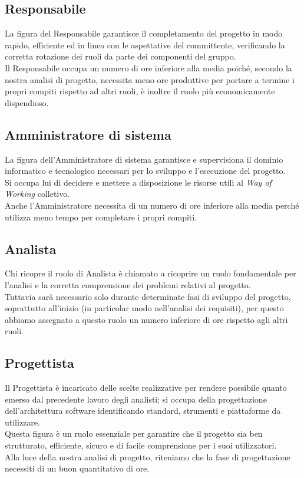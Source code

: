 \documentclass[a4paper, 11pt]{article}
\begin{document}
\subsection{Responsabile}
La figura del Responsabile garantisce il completamento del progetto in modo rapido, efficiente ed in linea con le aspettative del committente, verificando la corretta rotazione dei ruoli da parte dei componenti del gruppo. \\
Il Responsabile occupa un numero di ore inferiore alla media poiché, secondo la nostra analisi di progetto, necessita meno ore produttive per portare a termine i propri compiti rispetto ad altri ruoli, è inoltre il ruolo più economicamente dispendioso.

\subsection{Amministratore di sistema}

La figura dell'Amministratore di sistema garantisce e supervisiona il dominio informatico e tecnologico necessari per lo sviluppo e l'esecuzione del progetto. \\
Si occupa lui di decidere e mettere a disposizione le risorse utili al \textit{Way of Working} colletivo. \\
Anche l'Amministratore necessita di un numero di ore inferiore alla media perché utilizza meno tempo per completare i propri compiti.

\subsection{Analista}
Chi ricopre il ruolo di Analista è chiamato a ricoprire un ruolo fondamentale per l'analisi e la corretta comprensione dei problemi relativi al progetto. \\
Tuttavia sarà necessario solo durante determinate fasi di sviluppo del progetto, soprattutto all'inizio (in particolar modo nell'analisi dei requisiti), per questo abbiamo assegnato a questo ruolo un numero inferiore di ore rispetto agli altri ruoli.
\pagebreak
\subsection{Progettista}

Il Progettista è incaricato delle scelte realizzative per rendere possibile quanto emerso dal precedente lavoro degli analisti; si occupa della progettazione dell'architettura software identificando standard, strumenti e piattaforme da utilizzare. \\
Questa figura è un ruolo essenziale per garantire che il progetto sia ben strutturato, efficiente, sicuro e di facile comprensione per i suoi utilizzatori. \\
Alla luce della nostra analisi di progetto, riteniamo che la fase di progettazione necessiti di un buon quantitativo di ore.
\end{document}
